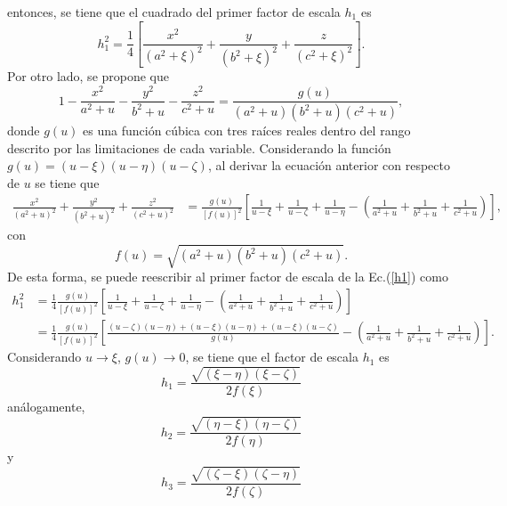 entonces, se tiene que el cuadrado del primer factor de escala $h_1$ es
\begin{equation}
    h_1^2=\frac{1}{4}\left[\frac{x^2}{(a^2+\xi)^2}+\frac{y}{(b^2+\xi)^2}+\frac{z}{(c^2+\xi)^2}\right].
    \label{h1}
\end{equation}
Por otro lado, se propone que
\begin{equation}
    1-\frac{x^2}{a^2+u}-\frac{y^2}{b^2+u}-\frac{z^2}{c^2+u}=\frac{g(u)}{(a^2+u)(b^2+u)(c^2+u)},
\end{equation}
donde $g(u)$ es una función cúbica con tres raíces reales dentro del rango descrito por las limitaciones de cada variable. Considerando la función $g(u)=(u-\xi)(u-\eta)(u-\zeta)$,  al derivar la ecuación anterior con respecto de $u$ se tiene que
\begin{align}
    \frac{x^2}{(a^2+u)^2}+\frac{y^2}{(b^2+u)^2}+\frac{z^2}{(c^2+u)^2}&=\frac{g(u)}{[f(u)]^2}\left[\frac{1}{u-\xi}+\frac{1}{u-\zeta}+\frac{1}{u-\eta}-\left(\frac{1}{a^2+u}+\frac{1}{b^2+u}+\frac{1}{c^2+u}\right)\right],
\end{align}
con 
\begin{equation}
    f(u)=\sqrt{(a^2+u)(b^2+u)(c^2+u)}.    
\end{equation}
De esta forma, se puede reescribir al primer factor de escala de la Ec.(\ref{h1}) como
\begin{align*}
h_1^2&=\frac{1}{4}\frac{g(u)}{[f(u)]^2}\left[\frac{1}{u-\xi}+\frac{1}{u-\zeta}+\frac{1}{u-\eta}-\left(\frac{1}{a^2+u}+\frac{1}{b^2+u}+\frac{1}{c^2+u}\right)\right]\nonumber\\
&=\frac{1}{4}\frac{g(u)}{[f(u)]^2}\left[\frac{(u-\zeta)(u-\eta)+(u-\xi)(u-\eta)+(u-\xi)(u-\zeta)}{g(u)}-\left(\frac{1}{a^2+u}+\frac{1}{b^2+u}+\frac{1}{c^2+u}\right)\right].    
\end{align*}
Considerando $u\rightarrow\xi$, $g(u)\rightarrow 0$, se tiene que el factor de escala $h_1$ es
\begin{equation}
    h_1=\frac{\sqrt{(\xi-\eta)(\xi-\zeta)}}{2f(\xi)}    
\end{equation}
análogamente, 
\begin{equation}
    h_2=\frac{\sqrt{(\eta-\xi)(\eta-\zeta)}}{2f(\eta)}
\end{equation}
y 
\begin{equation}
    h_3=\frac{\sqrt{(\zeta-\xi)(\zeta-\eta)}}{2f(\zeta)}
\end{equation}

